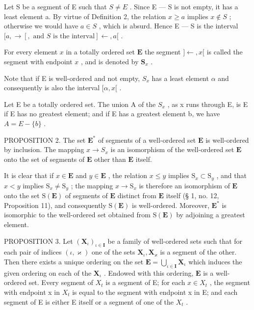 Let S be a segment of E such that \(S \neq E\) . Since E --- S is not empty, it has a least element a. By virtue of Definition 2, the relation \(x \geqslant a\) implies \(x \notin S\) ; otherwise we would have \(a \in S\) , which is absurd. Hence E --- S is the interval \([a, \rightarrow[, \text{ and } S \text{ is the interval}] \leftarrow, a[\) .

For every element \(x\) in a totally ordered set \(\mathbf{E}\) the segment \(] \leftarrow, x[\) is called the segment with endpoint \(x\) , and is denoted by \(\mathbf{S}_x\) .

Note that if E is well-ordered and not empty, \(S_{x}\) has a least element \(\alpha\) and consequently is also the interval \([\alpha, x[\) .

Let E be a totally ordered set. The union A of the \(S_{x}\) , as x runs through E, is E if E has no greatest element; and if E has a greatest element b, we have \(A = E - \{b\}\) .

PROPOSITION 2. The set \(\mathbf{E}^*\) of segments of a well-ordered set \(\mathbf{E}\) is well-ordered by inclusion. The mapping \(x \to S_x\) is an isomorphism of the well-ordered set \(\mathbf{E}\) onto the set of segments of \(\mathbf{E}\) other than \(\mathbf{E}\) itself.

It is clear that if \(x \in \mathbf{E}\) and \(y \in \mathbf{E}\) , the relation \(x \leqslant y\) implies \(\mathrm{S}_x \subset \mathrm{S}_y\) , and that \(x < y\) implies \(\mathrm{S}_x \neq \mathrm{S}_y\) ; the mapping \(x \to \mathrm{S}_x\) is therefore an isomorphism of \(\mathbf{E}\) onto the set \(\mathrm{S}(\mathbf{E})\) of segments of \(\mathbf{E}\) distinct from \(\mathbf{E}\) itself (§ 1, no. 12, Proposition 11), and consequently \(\mathrm{S}(\mathbf{E})\) is well-ordered. Moreover, \(\mathbf{E}^*\) is isomorphic to the well-ordered set obtained from \(\mathrm{S}(\mathbf{E})\) by adjoining a greatest element.

PROPOSITION 3. Let \((\mathbf{X}_{\iota})_{\iota \in \mathbf{I}}\) be a family of well-ordered sets such that for each pair of indices \((\iota, \varkappa)\) one of the sets \(\mathbf{X}_{\iota}, \mathbf{X}_{\varkappa}\) is a segment of the other. Then there exists a unique ordering on the set \(\mathbf{E} = \bigcup_{\iota \in \mathbf{I}} \mathbf{X}_{\iota}\) which induces the given ordering on each of the \(\mathbf{X}_{\iota}\) . Endowed with this ordering, \(\mathbf{E}\) is a well-ordered set. Every segment of \(X_{t}\) is a segment of E; for each \(x \in X_{t}\) , the segment with endpoint x in \(X_{t}\) is equal to the segment with endpoint x in E; and each segment of E is either E itself or a segment of one of the \(X_{t}\) .


